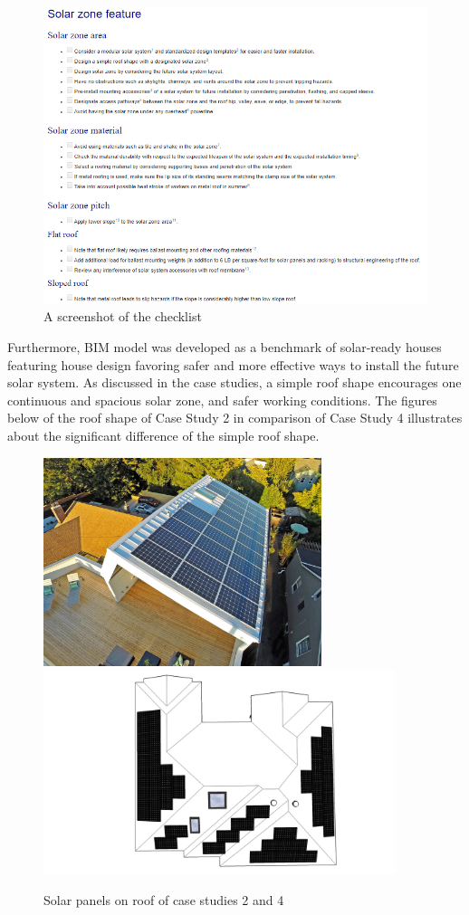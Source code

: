 \documentclass[]{article}
\begin{document}
\begin{figure}
\centering
\includegraphics{check.png}
\caption{A screenshot of the checklist}
\end{figure}

Furthermore, BIM model was developed as a benchmark of solar-ready
houses featuring house design favoring safer and more effective ways to
install the future solar system. As discussed in the case studies, a
simple roof shape encourages one continuous and spacious solar zone, and
safer working conditions. The figures below of the roof shape of Case
Study 2 in comparison of Case Study 4 illustrates about the significant
difference of the simple roof shape.

\begin{figure}
\includegraphics[width=3.2in]{../case_studies/case2/dwelldevelopmentsolar2} \includegraphics[width=4.04in]{../case_studies/case4/ColorOH} \caption{Solar panels on roof of case studies 2 and 4}\label{fig:unnamed-chunk-6}
\end{figure}
\end{document}

